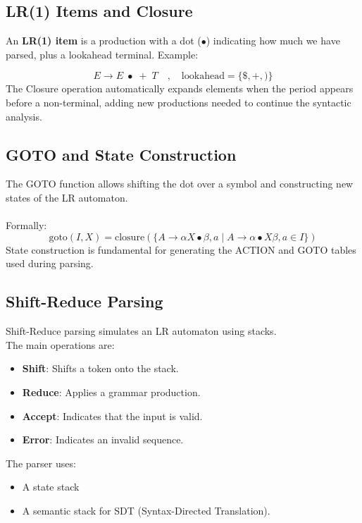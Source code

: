 \documentclass[letterpaper,12pt,oneside]{article}
\begin{document}
    \subsection{LR(1) Items and Closure}
    An \textbf{LR(1) item} is a production with a dot ($\bullet$) indicating how much we have parsed, plus a lookahead terminal. Example:
	
	\[
	E \rightarrow E \; \bullet \; + \; T \quad , \quad \text{lookahead} = \{ \$, +, ) \}
	\]
    The Closure operation automatically expands elements when the period appears before a non-terminal, adding new productions needed to continue the syntactic analysis.\cite{gfg_sdt_2025}

    \subsection{GOTO and State Construction}
    The GOTO function allows shifting the dot over a symbol and constructing new states of the LR automaton.
    \\ \\ 
    Formally:
    \[
	\text{goto}(I, X) = \text{closure}(\{ A \rightarrow \alpha X \bullet \beta , a \mid A \rightarrow \alpha \bullet X \beta , a \in I \})
	\]
    State construction is fundamental for generating the ACTION and GOTO tables used during parsing.\cite{gfg_sdt_2025}
    
    \subsection{Shift-Reduce Parsing}
    Shift-Reduce parsing simulates an LR automaton using stacks. \\
    The main operations are:
    \begin{itemize}
        \item \textbf{Shift}: Shifts a token onto the stack.
        \item \textbf{Reduce}: Applies a grammar production.
        \item \textbf{Accept}: Indicates that the input is valid.
        \item \textbf{Error}: Indicates an invalid sequence.
    \end{itemize}
    The parser uses:
    \begin{itemize}
        \item A state stack
        \item A semantic stack for SDT (Syntax-Directed Translation).
    \end{itemize}
\end{document}
